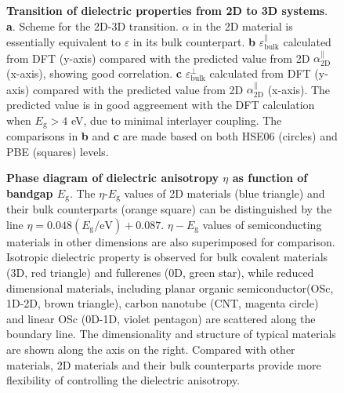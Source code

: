 \documentclass[journal=ancac3,manuscript=article,email=true,hyperref=true,keywords=false]{achemso}
\begin{document}
\begin{figure}[H]
\centering
\caption{\label{fig-4} \textbf{Transition of dielectric properties
    from 2D to 3D systems}. \textbf{a}. Scheme for the 2D-3D
  transition. $\alpha$ in the 2D material is essentially equivalent to
  $\varepsilon$ in its bulk counterpart. \textbf{b}
  $\varepsilon_{\mathrm{bulk}}^{\parallel}$ calculated from DFT
  (y-axis) compared with the predicted value from 2D
  $\alpha_{\mathrm{2D}}^{\parallel}$ (x-axis), showing good correlation. \textbf{c}
  $\varepsilon_{\mathrm{bulk}}^{\perp}$ calculated from DFT (y-axis)
  compared with the predicted value from 2D $\alpha_{\mathrm{2D}}^{\parallel}$
  (x-axis). The predicted value is in good aggreement with the DFT
  calculation when $E_{\mathrm{g}}>4$ eV, due to minimal interlayer
  coupling. The comparisons in \textbf{b} and \textbf{c} are made
  based on both HSE06 (circles) and PBE (squares) levels.}
\end{figure}

\begin{figure}[H]
  \centering
  \caption{\textbf{Phase diagram of dielectric anisotropy $\eta$ as
      function of bandgap $E_{\mathrm{g}}$}. The
    $\eta$-$E_{\mathrm{g}}$ values of 2D materials (blue triangle) and
    their bulk counterparts (orange square) can be distinguished by
    the line $\eta=0.048(E_{\mathrm{g}}/\mathrm{eV})+0.087$. $\eta-E_{\mathrm{g}}$ values of
    semiconducting materials in other dimensions are also superimposed
    for comparison. Isotropic dielectric property is observed for bulk
    covalent materials (3D, red triangle) and fullerenes (0D, green
    star), while reduced dimensional materials, including planar
    organic semiconductor(OSc, 1D-2D, brown triangle), carbon nanotube
    (CNT, magenta circle) and linear OSc (0D-1D, violet pentagon) are
    scattered along the boundary line. The dimensionality and
    structure of typical materials are shown along the axis on the
    right. Compared with other materials, 2D materials and their bulk
    counterparts provide more flexibility of controlling the
    dielectric anisotropy.}
  \label{fig:aniso}
\end{figure}
\end{document}
